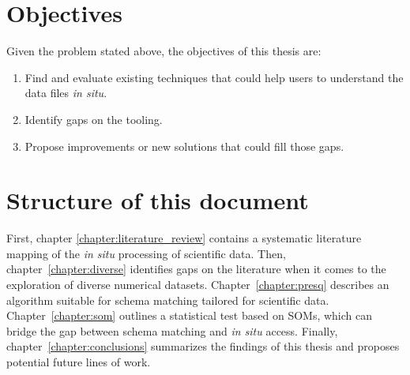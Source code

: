 \section{Objectives}


Given the problem stated above, the objectives of this thesis are:

\begin{enumerate}
    \item Find and evaluate existing techniques that could help users to understand the data files
        \emph{in situ}.
    \item Identify gaps on the tooling.
    \item Propose improvements or new solutions that could fill those gaps.
    \label{enum:objectives}
\end{enumerate}

\section{Structure of this document}

First, chapter \ref{chapter:literature_review} contains a systematic literature mapping of the
\emph{in situ} processing of scientific data.
Then, chapter~\ref{chapter:diverse} identifies gaps on the literature when it comes to the exploration
of diverse numerical datasets.
Chapter~\ref{chapter:presq} describes an algorithm
suitable for schema matching tailored for scientific data. Chapter~\ref{chapter:som}
outlines a statistical test based on \glspl{SOM}, which can bridge the gap
between schema matching and \emph{in situ} access. Finally, chapter~\ref{chapter:conclusions}
summarizes the findings of this thesis and proposes potential future lines of work.
